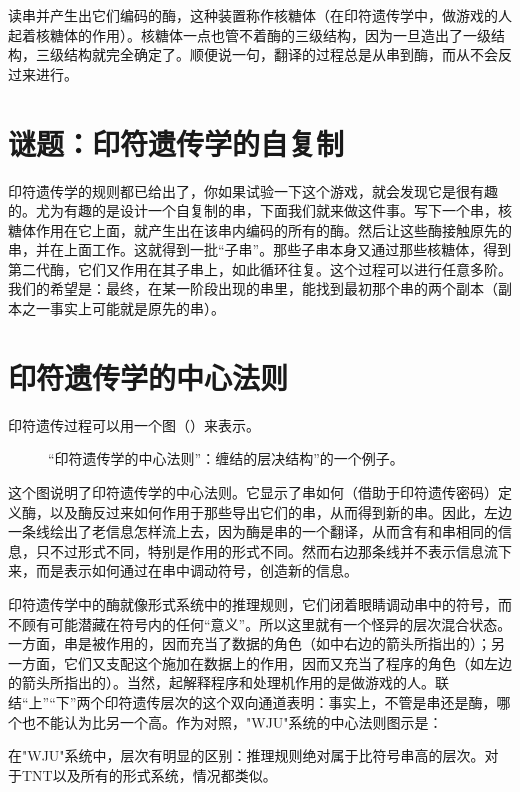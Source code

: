 读串并产生出它们编码的酶，这种装置称作核糖体（在印符遗传学中，做游戏的人起着核糖体的作用）。核糖体一点也管不着酶的三级结构，因为一旦造出了一级结构，三级结构就完全确定了。顺便说一句，翻译的过程总是从串到酶，而从不会反过来进行。

\section{谜题：印符遗传学的自复制}

印符遗传学的规则都已给出了，你如果试验一下这个游戏，就会发现它是很有趣的。尤为有趣的是设计一个自复制的串，下面我们就来做这件事。写下一个串，核糖体作用在它上面，就产生出在该串内编码的所有的酶。然后让这些酶接触原先的串，并在上面工作。这就得到一批“子串”。那些子串本身又通过那些核糖体，得到第二代酶，它们又作用在其子串上，如此循环往复。这个过程可以进行任意多阶。我们的希望是：最终，在某一阶段出现的串里，能找到最初那个串的两个副本（副本之一事实上可能就是原先的串）。

\section{印符遗传学的中心法则}

印符遗传过程可以用一个图（）来表示。

\begin{figure}
\caption[印符遗传学的中心法则。]
  {“印符遗传学的中心法则”：缠结的层决结构”的一个例子。}
\end{figure}

这个图说明了印符遗传学的中心法则。它显示了串如何（借助于印符遗传密码）定义酶，以及酶反过来如何作用于那些导出它们的串，从而得到新的串。因此，左边一条线绘出了老信息怎样流上去，因为酶是串的一个翻译，从而含有和串相同的信息，只不过形式不同，特别是作用的形式不同。然而右边那条线并不表示信息流下来，而是表示如何通过在串中调动符号，创造新的信息。

印符遗传学中的酶就像形式系统中的推理规则，它们闭着眼睛调动串中的符号，而不顾有可能潜藏在符号内的任何“意义”。所以这里就有一个怪异的层次混合状态。一方面，串是被作用的，因而充当了数据的角色（如中右边的箭头所指出的）；另一方面，它们又支配这个施加在数据上的作用，因而又充当了程序的角色（如左边的箭头所指出的）。当然，起解释程序和处理机作用的是做游戏的人。联结“上”“下”两个印符遗传层次的这个双向通道表明：事实上，不管是串还是酶，哪个也不能认为比另一个高。作为对照，"WJU"系统的中心法则图示是：
\begin{center}
\end{center}\nointerlineskip
在"WJU"系统中，层次有明显的区别：推理规则绝对属于比符号串高的层次。对于TNT以及所有的形式系统，情况都类似。

